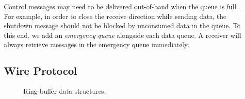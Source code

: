 Control messages may need to be delivered out-of-band when the queue is full. For example, in order to close the receive direction while sending data, the shutdown message should not be blocked by unconsumed data in the queue. To this end, we add an \textit{emergency queue} alongside each data queue.
A receiver will always retrieve messages in the emergency queue immediately.
\fi


\subsection{Wire Protocol}
\label{subsec:lockless-queue}

\begin{figure}[t]
	\centering
	\hspace{0.02\textwidth}
	\vspace{-10pt}
	\caption{Ring buffer data structures.}
\end{figure}



